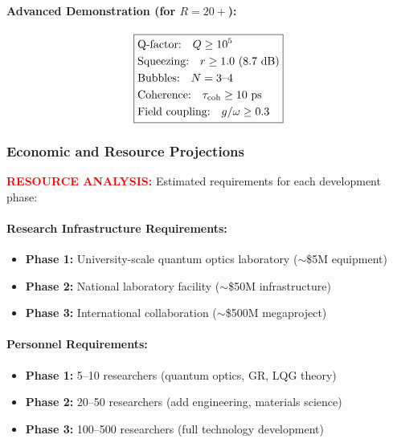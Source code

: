 \documentclass[11pt]{article}
\begin{document}
\paragraph{Advanced Demonstration (for $R = 20+$):}
\begin{align*}
\boxed{
\begin{aligned}
&\text{Q-factor:} \quad Q \geq 10^5 \\
&\text{Squeezing:} \quad r \geq 1.0 \text{ (8.7 dB)} \\
&\text{Bubbles:} \quad N = 3\text{--}4 \\
&\text{Coherence:} \quad \tau_{\rm coh} \geq 10\text{ ps} \\
&\text{Field coupling:} \quad g/\omega \geq 0.3
\end{aligned}
}
\end{align*}

\subsubsection*{Economic and Resource Projections}
\textcolor{red}{\textbf{RESOURCE ANALYSIS:}} Estimated requirements for each development phase:

\paragraph{Research Infrastructure Requirements:}
\begin{itemize}
  \item \textbf{Phase 1:} University-scale quantum optics laboratory ($\sim$\$5M equipment)
  \item \textbf{Phase 2:} National laboratory facility ($\sim$\$50M infrastructure)
  \item \textbf{Phase 3:} International collaboration ($\sim$\$500M megaproject)
\end{itemize}

\paragraph{Personnel Requirements:}
\begin{itemize}
  \item \textbf{Phase 1:} 5--10 researchers (quantum optics, GR, LQG theory)
  \item \textbf{Phase 2:} 20--50 researchers (add engineering, materials science)
  \item \textbf{Phase 3:} 100--500 researchers (full technology development)
\end{itemize}
\end{document}
